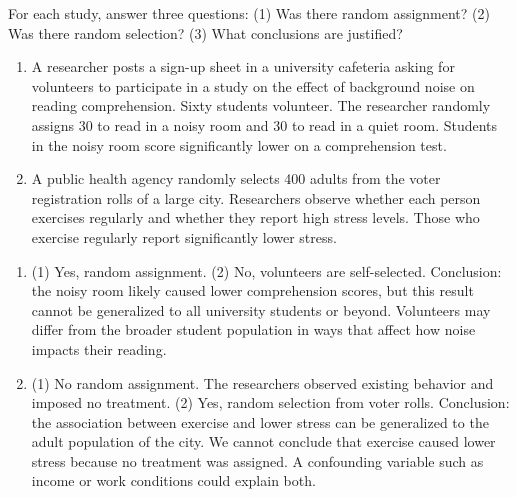 \begin{Exercise}[title={Random Assignment vs. Random Selection}, label={ex:assign-vs-select}]
For each study, answer three questions: (1) Was there random assignment? (2) Was there random selection? (3) What conclusions are justified?

\begin{enumerate}
    \item A researcher posts a sign-up sheet in a university cafeteria asking for volunteers to participate in a study on the effect of background noise on reading comprehension. Sixty students volunteer. The researcher randomly assigns 30 to read in a noisy room and 30 to read in a quiet room. Students in the noisy room score significantly lower on a comprehension test.

    \item A public health agency randomly selects 400 adults from the voter registration rolls of a large city. Researchers observe whether each person exercises regularly and whether they report high stress levels. Those who exercise regularly report significantly lower stress.
\end{enumerate}
\end{Exercise}
\begin{Answer}[ref={ex:assign-vs-select}]
\begin{enumerate}
    \item (1) Yes, random assignment. (2) No, volunteers are self-selected. Conclusion: the noisy room likely caused lower comprehension scores, but this result cannot be generalized to all university students or beyond. Volunteers may differ from the broader student population in ways that affect how noise impacts their reading.

    \item (1) No random assignment. The researchers observed existing behavior and imposed no treatment. (2) Yes, random selection from voter rolls. Conclusion: the association between exercise and lower stress can be generalized to the adult population of the city. We cannot conclude that exercise caused lower stress because no treatment was assigned. A confounding variable such as income or work conditions could explain both.
\end{enumerate}
\end{Answer}

